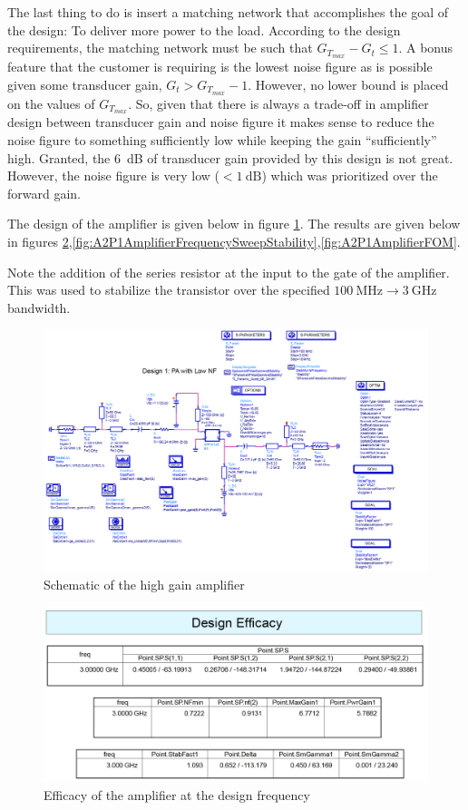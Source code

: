 The last thing to do is insert a matching network that accomplishes the goal of
the design: To deliver more power to the load. According to the design
requirements, the matching network must be such that $G_{T_{max}} - G_t \le 1$.
A bonus feature that the customer is requiring is the lowest noise figure as is possible
given some transducer gain, $G_t > G_{T_{max}} -1$. However, no lower bound is placed on the
values of $G_{T_{max}}$. So, given that there is always a trade-off in amplifier
design between transducer gain and noise figure it makes sense to reduce the
noise figure to something sufficiently low while keeping the gain
``sufficiently'' high. Granted, the \SI{6}{\deci\bel} of transducer gain
provided by this design is not great.  However, the noise figure is very low ($<
\SI{1}{\deci\bel}$) which was prioritized over the forward gain.

The design of the amplifier is given below in figure
\ref{fig:A2P1AmplifierSchematic}. The results are given below in figures
\ref{fig:A2P1AmplifierDesignFrequencyEfficacy},\ref{fig:A2P1AmplifierFrequencySweepStability},\ref{fig:A2P1AmplifierFOM}.

Note the addition of the series resistor at the input to the gate of the
amplifier. This was used to stabilize the transistor over the specified $
\SI{100}{\mega\hertz} \rightarrow \SI{3}{\giga\hertz}$ bandwidth.

\begin{figure}[H]
    \centering
    \includegraphics[width=0.8\linewidth]{Images/A2P1AmplifierSchematic.png}
    \caption{Schematic of the high gain amplifier}
    \label{fig:A2P1AmplifierSchematic}
\end{figure}

\begin{figure}[H]
    \centering
    \includegraphics[width=0.8\linewidth]{Images/A2P1AmplifierDesignFrequencyEfficacy.png}
    \caption{Efficacy of the amplifier at the design frequency}
    \label{fig:A2P1AmplifierDesignFrequencyEfficacy}
\end{figure}

